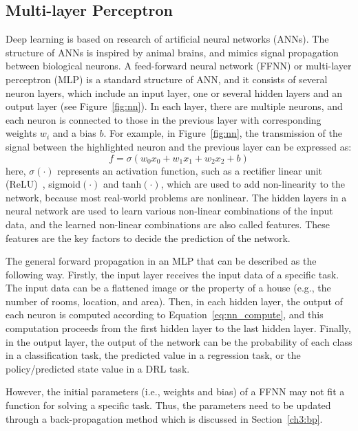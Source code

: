 \subsection{Multi-layer Perceptron}
Deep learning is based on research of artificial neural networks (ANNs). The structure of ANNs is inspired by animal brains, and mimics signal propagation between biological neurons. A feed-forward neural network (FFNN) or multi-layer perceptron (MLP) is a standard structure of ANN, and it consists of several neuron layers, which include an input layer, one or several hidden layers and an output layer (see Figure~\ref{fig:nn}). In each layer, there are multiple neurons, and each neuron is connected to those in the previous layer with corresponding weights $w_{i}$ and a bias $b$. For example, in Figure~\ref{fig:nn}, the transmission of the signal between the highlighted neuron and the previous layer can be expressed as:
\begin{equation}
    f = \sigma (w_{0}x_{0} + w_{1}x_{1} + w_{2}x_{2} + b)
\label{eq:nn_compute}
\end{equation}
here, $\sigma(\cdot)$ represents an activation function, such as a rectifier linear unit (ReLU)~\cite{nair2010rectified}, sigmoid$(\cdot)$ and tanh$(\cdot)$, which are used to add non-linearity to the network, because most real-world problems are nonlinear. The hidden layers in a neural network are used to learn various non-linear combinations of the input data, and the learned non-linear combinations are also called features. These features are the key factors to decide the prediction of the network.

The general forward propagation in an MLP that can be described as the following way. Firstly, the input layer receives the input data of a specific task. The input data can be a flattened image or the property of a house (e.g., the number of rooms, location, and area). Then, in each hidden layer, the output of each neuron is computed according to Equation~\eqref{eq:nn_compute}, and this computation proceeds from the first hidden layer to the last hidden layer. Finally, in the output layer, the output of the network can be the probability of each class in a classification task, the predicted value in a regression task, or the policy/predicted state value in a DRL task.

However, the initial parameters (i.e., weights and bias) of a FFNN may not fit a function for solving a specific task. Thus, the parameters need to be updated through a back-propagation method which is discussed in Section~\ref{ch3:bp}.
